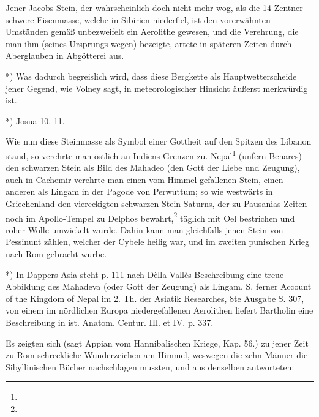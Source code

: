 \documentclass[a4paper, 11pt, oneside, polutonikogreek, german]{article}
\begin{document}
Jener Jacobs-Stein, der wahrscheinlich doch nicht mehr wog, als die 14 Zentner schwere Eisenmasse, welche in Sibirien niederfiel, ist den vorerwähnten Umständen gemäß unbezweifelt ein Aerolithe gewesen, und die Verehrung, die man ihm (seines Ursprungs wegen) bezeigte, artete in späteren Zeiten durch Aberglauben in Abgötterei aus.

*) Was dadurch begreislich wird, dass diese Bergkette als Hauptwetterscheide jener Gegend, wie Volney sagt, in meteorologischer Hinsicht äußerst merkwürdig ist.

*) Josua 10. 11.

Wie nun diese Steinmasse als Symbol einer Gottheit auf den Spitzen des Libanon stand, so verehrte man östlich an Indiens Grenzen zu. Nepal\footnote{} (unfern Benares) den schwarzen Stein als Bild des Mahadeo (den Gott der Liebe und Zeugung), auch in Cachemir verehrte man einen vom Himmel gefallenen Stein, einen anderen als Lingam in der Pagode von Perwuttum; so wie westwärts in Griechenland den viereckigten schwarzen Stein Saturns, der zu Pausanias Zeiten noch im Apollo-Tempel zu Delphos bewahrt,\footnote{} täglich mit Oel bestrichen und roher Wolle umwickelt wurde. Dahin kann man gleichfalls jenen Stein von Pessinunt zählen, welcher der Cybele heilig war, und im zweiten punischen Krieg nach Rom gebracht wurbe.

*) In Dappers Asia steht p. 111 nach Dèlla Vallès Beschreibung eine treue Abbildung des Mahadeva (oder Gott der Zeugung) als Lingam. S. ferner Account of the Kingdom of Nepal im 2. Th. der Asiatik Researches, 8te Ausgabe S. 307, von einem im nördlichen Europa niedergefallenen Aerolithen liefert Bartholin eine Beschreibung in ist. Anatom. Centur. IIl. et IV. p. 337.

Es zeigten sich (sagt Appian vom Hannibalischen Kriege, Kap. 56.) zu jener Zeit zu Rom schreckliche Wunderzeichen am Himmel, weswegen die zehn Männer die Sibyllinischen Bücher nachschlagen mussten, und aus denselben antworteten:
\end{document}
